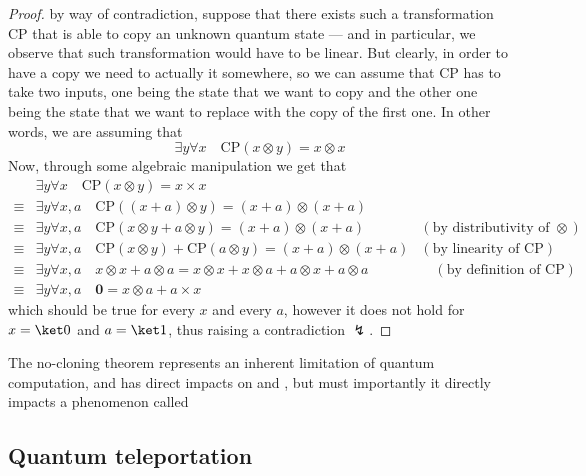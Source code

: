 \documentclass[a4paper, 12pt]{report}
\begin{document}
\begin{proof}
	by way of contradiction, suppose that there exists such a transformation CP that is able to copy an unknown quantum state --- and in particular, we observe that such transformation would have to be linear. But clearly, in order to have a copy we need to actually  it somewhere, so we can assume that CP has to take two inputs, one being the state that we want to copy and the other one being the state that we want to replace with the copy of the first one. In other words, we are assuming that $$\exists y \forall x \quad \mbox{CP}(x \otimes y) = x \otimes x$$ Now, through some algebraic manipulation we get that
	\begin{equation*}
		\begin{alignedat}{2}
			       & \exists y \forall x \quad \mbox{CP}(x \otimes y) = x \times x                                                  &                                         \\
			\equiv & \exists y \forall x, a \quad \mbox{CP}((x + a) \otimes y) = (x + a) \otimes (x + a)                            &                                         \\
			\equiv & \exists y \forall x, a \quad \mbox{CP}(x \otimes y + a \otimes y) = (x + a) \otimes (x + a)                    & (\mbox{by distributivity of $\otimes$}) \\
			\equiv & \exists y \forall x, a \quad \mbox{CP}(x \otimes y) + \mbox{CP}(a \otimes y) = (x + a) \otimes (x + a)         & (\mbox{by linearity of CP})             \\
			\equiv & \exists y \forall x, a \quad x \otimes x + a \otimes a = x \otimes x + x \otimes a + a \otimes x + a \otimes a & \quad (\mbox{by definition of CP})      \\
			\equiv & \exists y \forall x, a \quad \mathbf 0 = x \otimes a + a \times x
		\end{alignedat}
	\end{equation*}
	which should be true for every $x$ and every $a$, however it does not hold for $x = \ket 0$ and $a = \ket 1$, thus raising a contradiction $\lightning$.
\end{proof}

The no-cloning theorem represents an inherent limitation of quantum computation, and has direct impacts on  and , but must importantly it directly impacts a phenomenon called 

\subsection{Quantum teleportation}
\end{document}
